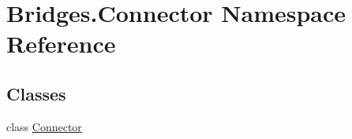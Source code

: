 \hypertarget{namespace_bridges_1_1_connector}{}\section{Bridges.\+Connector Namespace Reference}
\label{namespace_bridges_1_1_connector}
\subsection*{Classes}
\begin{DoxyCompactItemize}
\item 
class \hyperlink{class_bridges_1_1_connector_1_1_connector}{Connector}
\end{DoxyCompactItemize}
